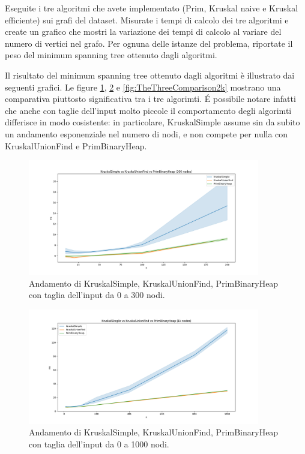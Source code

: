 \begin{displayquote}
Eseguite i tre algoritmi che avete implementato (Prim, Kruskal naive e Kruskal efficiente) sui grafi del dataset. Misurate i tempi di calcolo dei tre algoritmi e create un grafico che mostri la variazione dei tempi di calcolo al variare del numero di vertici nel grafo. Per ognuna delle istanze del problema, riportate il peso del minimum spanning tree ottenuto dagli algoritmi.
\end{displayquote}

\noindent Il risultato del minimum spanning tree ottenuto dagli algoritmi è illustrato dai seguenti
grafici. Le figure \ref{fig:TheThreeComparison300}, \ref{fig:TheThreeComparison1k}
e \ref{fig:TheThreeComparison2k} mostrano una comparativa piuttosto significativa tra i tre algorimti.
\'E possibile notare infatti che anche con taglie dell'input molto piccole il comportamento degli 
algorimti differisce in modo cosistente: in particolare, KruskalSimple assume sin da subito un
andamento esponenziale nel numero di nodi, e non compete per nulla con KruskalUnionFind e PrimBinaryHeap.

\begin{figure}[H]
    \centering
    \includegraphics[width=0.9\textwidth]{./images/KruskalSimple_vs_KruskalUnionFind_vs_PrimBinaryHeap_(300_nodes).png}
	\caption{Andamento di KruskalSimple, KruskalUnionFind, PrimBinaryHeap con taglia dell'input da 0 a 300 nodi.}
    \label{fig:TheThreeComparison300}
\end{figure}

\begin{figure}[H]
    \centering
    \includegraphics[width=0.9\textwidth]{./images/KruskalSimple_vs_KruskalUnionFind_vs_PrimBinaryHeap_(1k_nodes).png}
    \caption{Andamento di KruskalSimple, KruskalUnionFind, PrimBinaryHeap con taglia dell'input da 0 a 1000 nodi.}    
    \label{fig:TheThreeComparison1k}
\end{figure}

